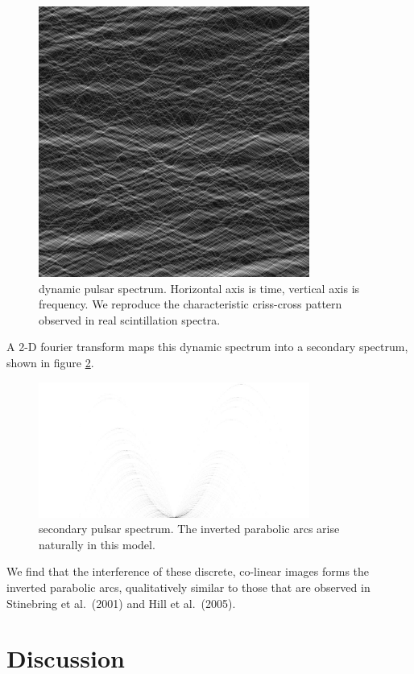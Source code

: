 \documentclass[useAMS,usenatbib]{mn2e}
\begin{document}
\begin{figure}
\centerline{\includegraphics[width=3.5in]{rspect.jpg}}
\caption{dynamic pulsar spectrum.  Horizontal axis is time, vertical
  axis is frequency.  We reproduce the characteristic criss-cross
  pattern observed in real scintillation spectra.}
\label{fig:ds}
\end{figure}

A 2-D fourier transform maps this dynamic spectrum into a secondary
spectrum, shown in figure \ref{fig:ss}.

\begin{figure}
\centerline{\includegraphics[width=3.5in]{sspectr.jpg}}
\caption{secondary pulsar spectrum.  The inverted parabolic arcs arise
naturally in this model.}
\label{fig:ss}
\end{figure}

We find that the interference of these discrete, co-linear images
forms the inverted parabolic arcs, qualitatively similar to those that are observed in
Stinebring et al.~(2001) and Hill et al.~(2005).



\section{Discussion}
\end{document}
